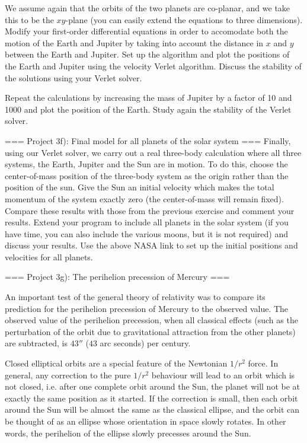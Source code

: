 \documentclass[11pt,a4paper]{article}
\begin{document}
We assume again that the orbits of the two planets are co-planar, and we take this to be the $xy$-plane (you can easily extend the equations to three dimensions). 
Modify your first-order differential equations in order to accomodate both the
motion of the Earth and Jupiter by taking into account the distance in $x$ and
$y$ between the Earth and Jupiter. Set up the algorithm and plot the positions of the Earth and Jupiter using the velocity Verlet algorithm.
Discuss the stability of the solutions using your Verlet solver.

Repeat 
the calculations by increasing the mass of Jupiter by a factor of 10 and 1000
 and plot the position of the Earth.  Study again the stability of the Verlet solver.

=== Project 3f): Final model for all planets of the solar system ===
Finally, using our Verlet solver, we carry out a real three-body calculation where all three systems, 
the Earth, Jupiter and the Sun are in motion. To do this, choose the center-of-mass position of the three-body system as 
the origin rather than the position of the sun. Give the Sun an initial velocity which makes the total momentum of the system exactly zero (the center-of-mass will remain fixed). Compare these results with those from the previous exercise and comment your results. Extend your program to include all planets in the solar system (if you have time, you can also include the various moons, but it is not required) and discuss your results. Use the above NASA link  to set up the initial positions and velocities for all planets. 


=== Project 3g): The perihelion precession of Mercury ===

An important test of the general theory of relativity was to compare its prediction for the
perihelion precession of Mercury to the observed value. The observed value of the perihelion precession, when
all classical effects (such as the perturbation of the orbit due to gravitational attraction from the other planets) are
subtracted, is $43''$ ($43$ arc seconds) per century.

Closed elliptical orbits are a special feature of the Newtonian $1/r^2$ force. In general, any correction to the
pure $1/r^2$ behaviour will lead to an orbit which is not closed, i.e. after one complete orbit around the Sun, the
planet will not be at exactly the same position as it started. If the correction is small, then each orbit around
the Sun will be almost the same as the classical ellipse, and the orbit can be thought of as an ellipse whose 
orientation in space slowly rotates. In other words, the perihelion of the ellipse slowly precesses around the Sun.
\end{document}
